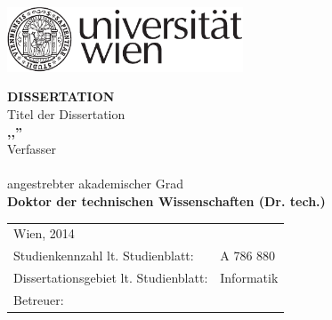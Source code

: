 
\makeatletter
\thispagestyle{empty}
\begin{titlepage}

\begin{flushright}
\includegraphics[width=7cm]{styles/logo-univie.pdf}
\end{flushright}

\begin{center}

\vskip 3cm

{\Large\bfseries DISSERTATION}\\[2.5cm]

{ Titel der Dissertation\\
\Large \bfseries ,,\@title''}\\[2cm]


{Verfasser\\
\bfseries \@author}\\[2cm]

{angestrebter akademischer Grad\\
\bfseries Doktor der technischen Wissenschaften (Dr. tech.)}\\[2cm]

\scalebox{1.1} {
\begin{tabular}{lp{8cm}}%
\small Wien, 2014 & ~\newline\newline\newline~ \\ %
\small Studienkennzahl lt. Studienblatt: & \small A 786 880 \\ %
\small Dissertationsgebiet lt. Studienblatt: & \small Informatik \\ %
\small Betreuer: & \small \\%
\end{tabular}}
\end{center}
\end{titlepage}
\makeatother